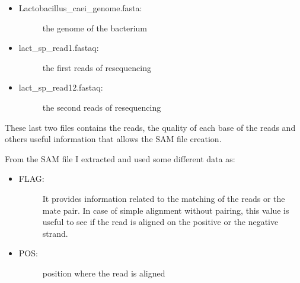 \begin{itemize}
\item \begin{description}
		\item[Lactobacillus\_caei\_genome.fasta:] the genome of the bacterium
	  \end{description}
\end{itemize}

\begin{itemize}
\item \begin{description}
		\item[lact\_sp\_read1.fastaq:] the first reads of resequencing
	  \end{description}
\end{itemize}

\begin{itemize}
\item \begin{description}
		\item[lact\_sp\_read12.fastaq:] the second reads of resequencing
	  \end{description}
\end{itemize}
  
These last two files contains the reads, the quality of each base of the reads and others useful information that allows the SAM file creation.

From the SAM file I extracted and used some different data as:

\begin{itemize}
\item \begin{description}
		\item[FLAG:] It provides information related to the matching of the reads or the mate pair. In case of simple alignment without pairing, this value is useful to see if the read is aligned on the positive or the negative strand.
	  \end{description}
\end{itemize}


\begin{itemize}
\item \begin{description}
		\item[POS:] position where the read is aligned
		  \end{description}
\end{itemize}

